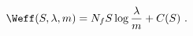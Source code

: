 \begin{equation}
\label{eq:Dep1}
\Weff(S,\lambda,m) = N_f S \log {\frac{\lambda}{m}} + C(S) ~. 
\end{equation}

